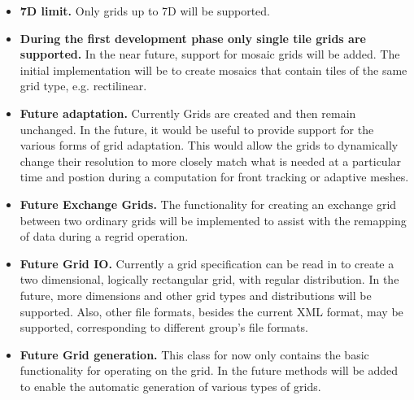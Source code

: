 

\begin{itemize}

\item {\bf 7D limit.}  Only grids up to 7D will be supported.

\item {\bf During the first development phase only single
tile grids are supported.}  In the near future, support
for mosaic grids will be added.  The initial implementation 
will be to create mosaics that contain tiles of the same
grid type, e.g. rectilinear.

\item {\bf Future adaptation.}  Currently Grids
are created and then remain unchanged. In the future, it would
be useful to provide support for the various forms of grid
adaptation. This would allow the grids to dynamically change
their resolution to more closely match what is needed at a particular
time and postion during a computation for front tracking or adaptive meshes.

\item {\bf Future Exchange Grids.}  The functionality for creating an 
exchange grid between two ordinary grids will be implemented
to assist with the remapping of data during a regrid operation. 

\item {\bf Future Grid IO.} Currently a grid specification can be read in to create a two dimensional, logically rectangular grid, with regular distribution.  In the future, more dimensions and other grid types and distributions will be supported. Also, other file formats, besides the current XML format, may be supported, corresponding to different group's file formats.

\item {\bf Future Grid generation.} This class for now only contains
the basic functionality for operating on the grid. In the future
methods will be added to enable the automatic generation of various types of
grids. 


\end{itemize}

